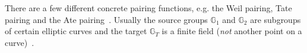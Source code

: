 There are a few different concrete pairing functions, e.g. the Weil pairing, Tate pairing and the Ate pairing~\cite{kiraz_still_2016}.
Usually the source groups $\mathbb{G}_1$ and $\mathbb{G}_2$ are subgroups of certain elliptic curves \cite{kiraz_still_2016} and the target $\mathbb{G}_T$ is a finite field (\emph{not} another point on a curve)~\cite{blake_advances_2005}.





